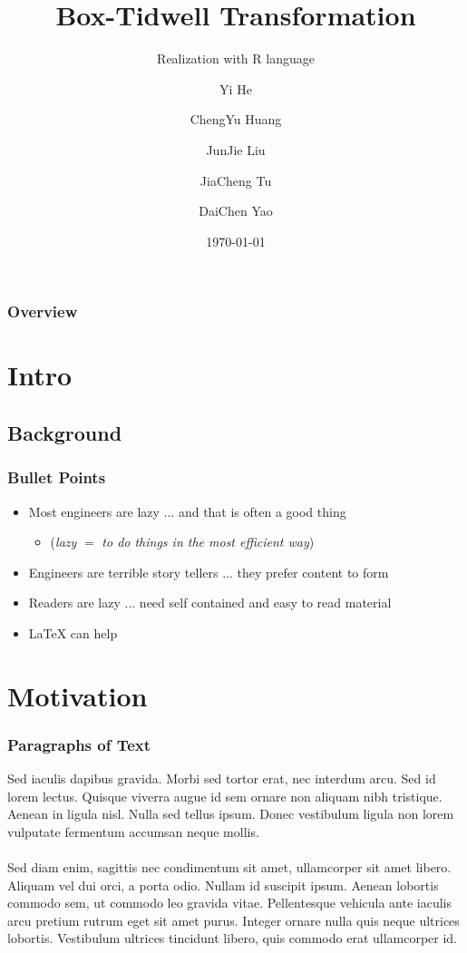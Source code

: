 \documentclass[10pt,aspectratio=32]{beamer}
\title{Box-Tidwell Transformation}
\subtitle{Realization with R language}
\author{Yi He \and ChengYu Huang \and JunJie Liu \\ \and JiaCheng Tu \and DaiChen Yao }
\institute{United International College - STAT}
\date{\today}
\begin{document}
\AtBeginSection[]{\frame{\sectionpage}} %

\begin{frame}
	\titlepage
\end{frame}

\begin{frame}
	\frametitle{Overview}
	\vspace{-0.7cm}
	\tableofcontents
\end{frame}

\section{Intro}
\subsection{Background}
\begin{frame}
\frametitle{Bullet Points}
\vspace{-0.3cm}

\begin{itemize}
	\item Most engineers are lazy ... and that is often a good thing
	\begin{itemize}
		\item (\textit{lazy} $=$ \textit{to do things in the most efficient way})
	\end{itemize}
	\item Engineers are terrible story tellers ... they prefer content to form
	\item Readers are lazy ... need self contained and easy to read material
	\item \LaTeX{} can help
\end{itemize}

 \end{frame}


\section{Motivation}
\begin{frame}
	\frametitle{Paragraphs of Text}
	\vspace{-0.8cm}
	Sed iaculis dapibus gravida. Morbi sed tortor erat, nec interdum arcu. Sed id lorem lectus. Quisque viverra augue id sem ornare non aliquam nibh tristique. Aenean in ligula nisl. Nulla sed tellus ipsum. Donec vestibulum ligula non lorem vulputate fermentum accumsan neque mollis.\\~\\

	Sed diam enim, sagittis nec condimentum sit amet, ullamcorper sit amet libero. Aliquam vel dui orci, a porta odio. Nullam id suscipit ipsum. Aenean lobortis commodo sem, ut commodo leo gravida vitae. Pellentesque vehicula ante iaculis arcu pretium rutrum eget sit amet purus. Integer ornare nulla quis neque ultrices lobortis. Vestibulum ultrices tincidunt libero, quis commodo erat ullamcorper id.
\end{frame}
\end{document}
